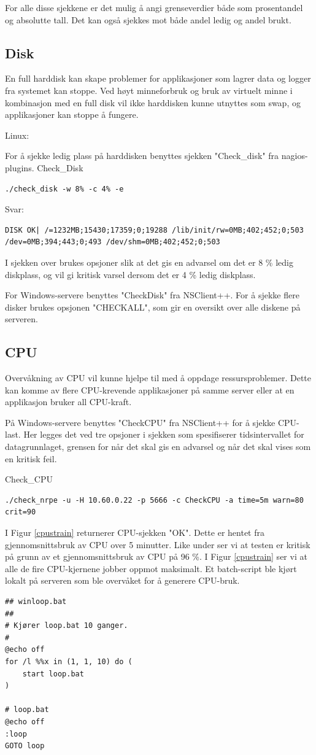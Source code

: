 For alle disse sjekkene er det mulig å angi grenseverdier både som prosentandel og absolutte tall. Det kan også sjekkes mot både andel ledig og andel brukt. 
\subsection{Disk}
En full harddisk kan skape problemer for applikasjoner som lagrer data og logger fra systemet kan stoppe. Ved høyt minneforbruk og bruk av virtuelt minne i kombinasjon med en full disk vil ikke harddisken kunne utnyttes som swap, og applikasjoner kan stoppe å fungere.

Linux:

For å sjekke ledig plass på harddisken benyttes sjekken "Check\_disk" fra nagios-plugins.
Check\_Disk
\begin{lstlisting}
./check_disk -w 8% -c 4% -e
\end{lstlisting}
Svar: 
\begin{lstlisting}
DISK OK| /=1232MB;15430;17359;0;19288 /lib/init/rw=0MB;402;452;0;503 /dev=0MB;394;443;0;493 /dev/shm=0MB;402;452;0;503
\end{lstlisting}
I sjekken over brukes opsjoner slik at det gis en advarsel om det er 8 \% ledig diskplass, og vil gi kritisk varsel dersom det er 4 \% ledig diskplass.

For Windows-servere benyttes "CheckDisk" fra NSClient++. For å sjekke flere disker brukes opsjonen "CHECKALL", som gir en oversikt over alle diskene på serveren.

\subsection{CPU}
Overvåkning av CPU vil kunne hjelpe til med å oppdage ressursproblemer. Dette kan komme av flere CPU-krevende applikasjoner på samme server eller at en applikasjon bruker all CPU-kraft.  

På Windows-servere benyttes "CheckCPU" fra NSClient++ for å sjekke CPU-last. Her legges det ved tre opsjoner i sjekken som spesifiserer tidsintervallet for datagrunnlaget, grensen for når det skal gis en advarsel og når det skal vises som en kritisk feil.

Check\_CPU
\begin{lstlisting}
./check_nrpe -u -H 10.60.0.22 -p 5666 -c CheckCPU -a time=5m warn=80 crit=90
\end{lstlisting}
I Figur \ref{cpustrain} returnerer CPU-sjekken "OK". Dette er hentet fra gjennomsnittsbruk av CPU over 5 minutter. Like under ser vi at testen er kritisk på grunn av et gjennomsnittsbruk av CPU på 96 \%. I Figur \ref{cpustrain} ser vi at alle de fire CPU-kjernene jobber oppmot maksimalt. Et batch-script ble kjørt lokalt på serveren som ble overvåket for å generere CPU-bruk.
\begin{lstlisting}
## winloop.bat
##
# Kjører loop.bat 10 ganger.
#
@echo off
for /l %%x in (1, 1, 10) do (
    start loop.bat
)

# loop.bat
@echo off
:loop
GOTO loop
\end{lstlisting}

